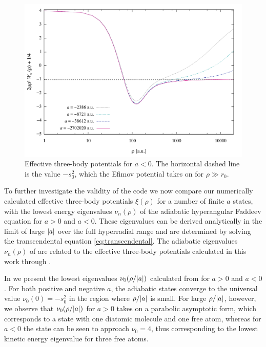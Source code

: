 \begin{figure}
	\includegraphics[width=\linewidth]{finite_negative_a.pdf}
	\caption{Effective three-body potentials for $a<0$. The horizontal dashed line is the value $-s_0^2$, which the Efimov potential takes on for $\rho\gg r_0$.}
	\label{fig:res_3}
\end{figure}

To further investigate the validity of the code we now compare our numerically calculated effective three-body potentials $\xi(\rho)$ for a number of finite $a$ states, with the lowest energy eigenvalues $\nu_n(\rho)$ of the adiabatic hyperangular Faddeev equation for $a>0$ and $a<0$. These eigenvalues can be derived analytically in the limit of large $\lvert a\rvert$ over the full hyperradial range and are determined by solving the transcendental equation \eqref{eq:transcendental}. The adiabatic eigenvalues $\nu_n(\rho)$ of  are related to the effective three-body potentials calculated in this work through . 

In  we present the lowest eigenvalues $\nu_0(\rho/\lvert a\rvert)$ calculated from  for $a>0$ and $a<0$. For both positive and negative $a$, the adiabatic states converge to the universal value $\nu_0(0) = -s_0^2$ in the region where $\rho/\lvert a\rvert$ is small. For large $\rho/\lvert a\rvert$, however, we observe that $\nu_0(\rho/\lvert a\rvert)$ for $a>0$ takes on a parabolic asymptotic form, which corresponds to a state with one diatomic molecule and one free atom, whereas for $a<0$ the state can be seen to approach $\nu_0=4$, thus corresponding to the lowest kinetic energy eigenvalue for three free atoms.  

